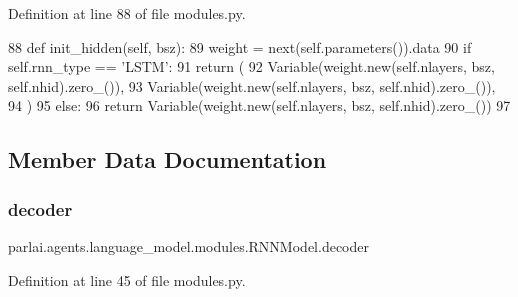 Definition at line 88 of file modules.\+py.


\begin{DoxyCode}
88     \textcolor{keyword}{def }init\_hidden(self, bsz):
89         weight = next(self.parameters()).data
90         \textcolor{keywordflow}{if} self.rnn\_type == \textcolor{stringliteral}{'LSTM'}:
91             \textcolor{keywordflow}{return} (
92                 Variable(weight.new(self.nlayers, bsz, self.nhid).zero\_()),
93                 Variable(weight.new(self.nlayers, bsz, self.nhid).zero\_()),
94             )
95         \textcolor{keywordflow}{else}:
96             \textcolor{keywordflow}{return} Variable(weight.new(self.nlayers, bsz, self.nhid).zero\_())
97 \end{DoxyCode}


\subsection{Member Data Documentation}
\mbox{\label{classparlai_1_1agents_1_1language__model_1_1modules_1_1RNNModel_a66e097f286de6aa1607505440b3931a5}} 
\subsubsection{\texorpdfstring{decoder}{decoder}}
{\footnotesize\ttfamily parlai.\+agents.\+language\+\_\+model.\+modules.\+R\+N\+N\+Model.\+decoder}



Definition at line 45 of file modules.\+py.

\mbox{\label{classparlai_1_1agents_1_1language__model_1_1modules_1_1RNNModel_aac342c5f6279b4de077793eecbdff823}} 
